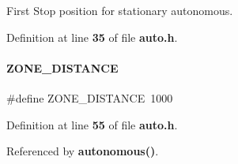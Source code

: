 First Stop position for stationary autonomous. 



Definition at line \textbf{ 35} of file \textbf{ auto.\+h}.

\mbox{\label{auto_8h_abe0d1da59836694bca507d0a5b61423b}} 
\paragraph{Z\+O\+N\+E\+\_\+\+D\+I\+S\+T\+A\+N\+CE}
{\footnotesize\ttfamily \#define Z\+O\+N\+E\+\_\+\+D\+I\+S\+T\+A\+N\+CE~1000}



Definition at line \textbf{ 55} of file \textbf{ auto.\+h}.



Referenced by \textbf{ autonomous()}.

